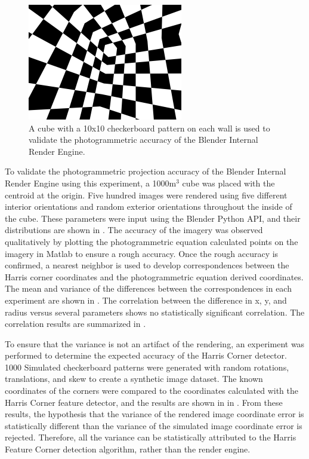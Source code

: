 \begin{figure}[H]
	\centering
	\includegraphics[height = 2in]{../fig/checkerRoom}
	\caption{A cube with a 10x10 checkerboard pattern on each wall is used to validate the photogrammetric accuracy of the Blender Internal Render Engine.}
	\label{fig:checker}
\end{figure}

To validate the photogrammetric projection accuracy of the Blender Internal Render Engine using this experiment, a 1000m$^3$ cube was placed with the centroid at the origin.  Five hundred images were rendered using five different interior orientations and random exterior orientations throughout the inside of the cube.  These parameters were input using the Blender Python API, and their distributions are shown in .  The accuracy of the imagery was observed qualitatively by plotting the photogrammetric equation calculated points on the imagery in Matlab to ensure a rough accuracy.  Once the rough accuracy is confirmed, a nearest neighbor is used to develop correspondences between the Harris corner coordinates and the photogrammetric equation derived coordinates.  The mean and variance of the differences between the correspondences in each experiment are shown in .  The correlation between the difference in x, y, and radius versus several parameters shows no statistically significant correlation.  The correlation results are summarized in .





To ensure that the variance is not an artifact of the rendering, an experiment was performed to determine the expected accuracy of the Harris Corner detector.  1000 Simulated checkerboard patterns were generated with random rotations, translations, and skew to create a synthetic image dataset.  The known coordinates of the corners were compared to the coordinates calculated with the Harris Corner feature detector, and the results are shown in in .  From these results, the hypothesis that the variance of the rendered image coordinate error is statistically different than the variance of the simulated image coordinate error is rejected.  Therefore, all the variance can be statistically attributed to the Harris Feature Corner detection algorithm, rather than the render engine. 

